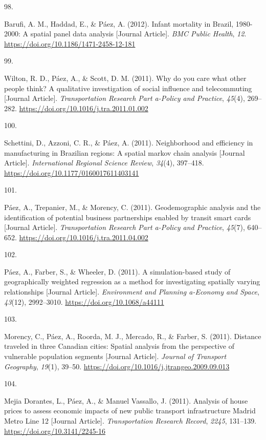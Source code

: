 \documentclass[11pt,a4paper,]{awesome-cv}
\newlength{\cslhangindent}
\newlength{\csllabelwidth}
\newenvironment{CSLReferences}[2] %
 {\begin{list}{}{%
  \setlength{\itemindent}{0pt}
  \setlength{\leftmargin}{0pt}
  \setlength{\parsep}{0pt}
  \ifodd #1
   \setlength{\leftmargin}{\cslhangindent}
   \setlength{\itemindent}{-1\cslhangindent}
  \fi
  \setlength{\itemsep}{#2\baselineskip}}}
 {\end{list}}
\newcommand{\CSLLeftMargin}[1]{\parbox[t]{\csllabelwidth}{\strut#1\strut}}
\newcommand{\CSLRightInline}[1]{\parbox[t]{\linewidth - \csllabelwidth}{\strut#1\strut}}
\begin{document}
\begin{CSLReferences}{0}{0}
\CSLLeftMargin{98. }%
\CSLRightInline{Barufi, A. M., Haddad, E., \& Páez, A. (2012). Infant
mortality in Brazil, 1980-2000: A spatial panel data analysis {[}Journal
Article{]}. \emph{BMC Public Health}, \emph{12}.
\url{https://doi.org/10.1186/1471-2458-12-181}}

\CSLLeftMargin{99. }%
\CSLRightInline{Wilton, R. D., Páez, A., \& Scott, D. M. (2011). Why do
you care what other people think? A qualitative investigation of social
influence and telecommuting {[}Journal Article{]}. \emph{Transportation
Research Part a-Policy and Practice}, \emph{45}(4), 269--282.
\url{https://doi.org/10.1016/j.tra.2011.01.002}}

\CSLLeftMargin{100. }%
\CSLRightInline{Schettini, D., Azzoni, C. R., \& Páez, A. (2011).
Neighborhood and efficiency in manufacturing in Brazilian regions: A
spatial markov chain analysis {[}Journal Article{]}. \emph{International
Regional Science Review}, \emph{34}(4), 397--418.
\url{https://doi.org/10.1177/0160017611403141}}

\CSLLeftMargin{101. }%
\CSLRightInline{Páez, A., Trepanier, M., \& Morency, C. (2011).
Geodemographic analysis and the identification of potential business
partnerships enabled by transit smart cards {[}Journal Article{]}.
\emph{Transportation Research Part a-Policy and Practice}, \emph{45}(7),
640--652. \url{https://doi.org/10.1016/j.tra.2011.04.002}}

\CSLLeftMargin{102. }%
\CSLRightInline{Páez, A., Farber, S., \& Wheeler, D. (2011). A
simulation-based study of geographically weighted regression as a method
for investigating spatially varying relationships {[}Journal Article{]}.
\emph{Environment and Planning a-Economy and Space}, \emph{43}(12),
2992--3010. \url{https://doi.org/10.1068/a44111}}

\CSLLeftMargin{103. }%
\CSLRightInline{Morency, C., Páez, A., Roorda, M. J., Mercado, R., \&
Farber, S. (2011). Distance traveled in three Canadian cities: Spatial
analysis from the perspective of vulnerable population segments
{[}Journal Article{]}. \emph{Journal of Transport Geography},
\emph{19}(1), 39--50.
\url{https://doi.org/10.1016/j.jtrangeo.2009.09.013}}

\CSLLeftMargin{104. }%
\CSLRightInline{Mejia Dorantes, L., Páez, A., \& Manuel Vassallo, J.
(2011). Analysis of house prices to assess economic impacts of new
public transport infrastructure Madrid Metro Line 12 {[}Journal
Article{]}. \emph{Transportation Research Record}, \emph{2245},
131--139. \url{https://doi.org/10.3141/2245-16}}


\end{CSLReferences}
\end{document}
